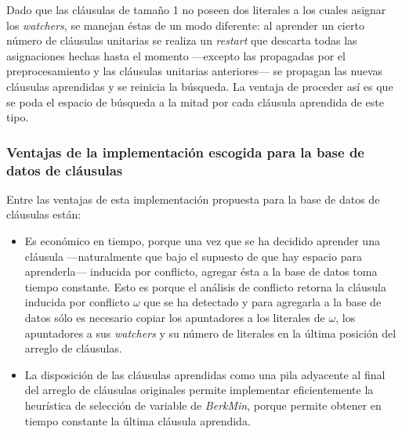 \documentclass[12pt,lettersize,oneside]{article}
\begin{document}
Dado que las cláusulas de tamaño 1 no poseen dos literales a los cuales asignar
los \emph{watchers}, se manejan éstas de un modo diferente: al aprender un
cierto número de cláusulas unitarias se realiza un \emph{restart} que descarta
todas las asignaciones hechas hasta el momento ---excepto las propagadas por el
preprocesamiento y las cláusulas unitarias anteriores--- se propagan las nuevas
cláusulas aprendidas y se reinicia la búsqueda. La ventaja de proceder así es
que se poda el espacio de búsqueda a la mitad por cada cláusula aprendida de
este tipo.

\subsubsection{Ventajas de la implementación escogida para la base de datos de cláusulas}
Entre las ventajas de esta implementación propuesta para la base de datos de
cláusulas están: \vspace{-2.5mm}

\begin{itemize}
\item Es económico en tiempo, porque una vez que se ha decidido aprender una
  cláusula ---naturalmente que bajo el supuesto de que hay espacio para
  aprenderla--- inducida por conflicto, agregar ésta a la base de datos toma
  tiempo constante. Esto es porque el análisis de conflicto retorna la cláusula
  inducida por conflicto $\omega$ que se ha detectado y para agregarla a la base
  de datos sólo es necesario copiar los apuntadores a los literales de $\omega$,
  los apuntadores a sus \emph{watchers} y su número de literales en la última
  posición del arreglo de cláusulas.

\item La disposición de las cláusulas aprendidas como una pila adyacente al
  final del arreglo de cláusulas originales permite implementar eficientemente
  la heurística de selección de variable de \emph{BerkMin}, porque permite
  obtener en tiempo constante la última cláusula aprendida.
\end{itemize}
\end{document}
